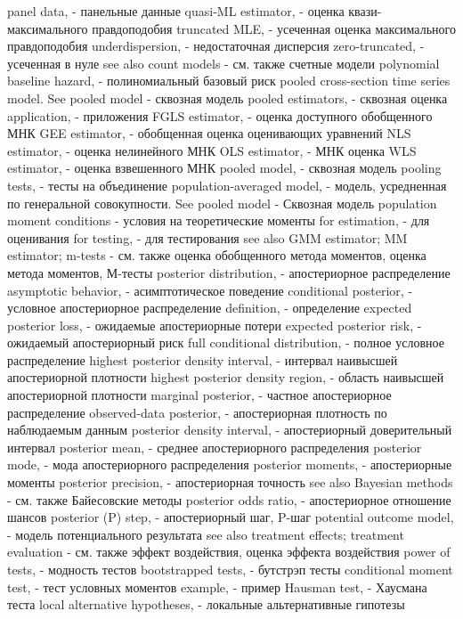 panel data, - панельные данные
quasi-ML estimator, - оценка квази-максимального правдоподобия
truncated MLE, - усеченная оценка максимального правдоподобия
underdispersion, - недостаточная дисперсия
zero-truncated, - усеченная в нуле
see also count models - см. также счетные модели
polynomial baseline hazard, - полиномиальный базовый риск
pooled cross-section time series model. See pooled model - сквозная модель
pooled estimators, - сквозная оценка
application, - приложения
FGLS estimator, - оценка доступного обобщенного МНК
GEE estimator, - обобщенная оценка оценивающих уравнений
NLS estimator, - оценка нелинейного МНК
OLS estimator, - МНК оценка
WLS estimator, - оценка взвешенного МНК
pooled model, - сквозная модель
pooling tests, - тесты на объединение
population-averaged model, - модель, усредненная по генеральной совокупности. See pooled model - Сквозная модель
population moment conditions - условия на теоретические моменты 
for estimation, - для оценивания
for testing, - для тестирования
see also GMM estimator; MM estimator; m-tests - см. также оценка обобщенного метода моментов, оценка метода моментов, М-тесты
posterior distribution, - апостериорное распределение
asymptotic behavior, - асимптотическое поведение
conditional posterior, - условное апостериорное распределение
definition, - определение
expected posterior loss, - ожидаемые апостериорные потери
expected posterior risk, - ожидаемый апостериорный риск
full conditional distribution, - полное условное распределение
highest posterior density interval, - интервал наивысшей апостериорной плотности
highest posterior density region, - область наивысшей апостериорной плотности
marginal posterior, - частное апостериорное распределение
observed-data posterior, - апостериорная плотность по наблюдаемым данным
posterior density interval, - апостериорный доверительный интервал
posterior mean, - среднее апостериорного распределения
posterior mode, - мода апостериорного распределения
posterior moments, - апостериорные моменты
posterior precision, - апостериорная точность
see also Bayesian methods - см. также Байесовские методы
posterior odds ratio, - апостериорное отношение шансов
posterior (P) step, - апостериорный шаг, P-шаг 
potential outcome model, - модель потенциального результата
see also treatment effects; treatment evaluation - см. также эффект воздействия, оценка эффекта воздействия
power of tests, - модность тестов
bootstrapped tests, - бутстрэп тесты
conditional moment test, - тест условных моментов
example, - пример
Hausman test, - Хаусмана теста
local alternative hypotheses, - локальные альтернативные гипотезы
